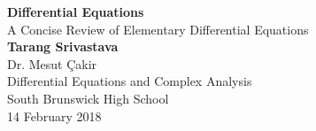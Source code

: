 \documentclass[11pt]{report}
\author{Tarang Srivastava}
\theoremstyle{definition}
\theoremstyle{definition}
\begin{document}
	
	\begin{titlepage}
		\begin{center}
			\vspace*{1cm}
			\Huge
			\textbf{Differential Equations}\\
			\vspace{0.5cm}
			\LARGE
			A Concise Review of Elementary Differential Equations\\
			\vspace{1.5cm}
			\textbf{Tarang Srivastava}\\
			\vfill
			\vspace{0.8cm}
			\Large
			Dr. Mesut \c{C}akir\\
			Differential Equations and Complex Analysis\\
			South Brunswick High School\\
			14 February 2018
		\end{center}
	\end{titlepage}
	
	\tableofcontents	
	\pagebreak
	
	
	
	
	
	
	
	
	
	
\end{document}
